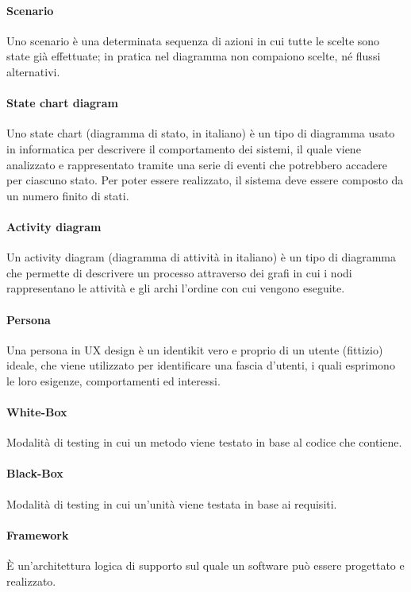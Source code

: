 \paragraph{Scenario} Uno scenario è una determinata sequenza di azioni in cui tutte le scelte sono state già effettuate; in pratica nel diagramma non compaiono scelte, né flussi alternativi.

\paragraph{State chart diagram} Uno state chart (diagramma di stato, in italiano) è un tipo di diagramma usato in informatica per descrivere il comportamento dei sistemi, il quale viene analizzato e rappresentato tramite una serie di eventi che potrebbero accadere per ciascuno stato. Per poter essere realizzato, il sistema deve essere composto da un numero finito di stati.

\paragraph{Activity diagram} Un activity diagram (diagramma di attività in italiano) è un tipo di diagramma che permette di descrivere un processo attraverso dei grafi in cui i nodi rappresentano le attività e gli archi l'ordine con cui vengono eseguite.

\paragraph{Persona} Una persona in UX design è un identikit vero e proprio di un utente (fittizio) ideale, che viene utilizzato per identificare una fascia d'utenti, i quali esprimono le loro esigenze, comportamenti ed interessi.  

\paragraph{White-Box} Modalità di testing in cui un metodo viene testato in base al codice che contiene.

\paragraph{Black-Box} Modalità di testing in cui un'unità viene testata in base ai requisiti.

\paragraph{Framework} \`{E} un'architettura logica di supporto sul quale un software può essere progettato e realizzato.

